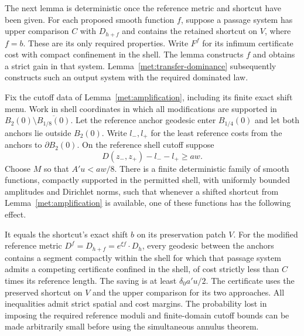 The next lemma is deterministic once the reference metric and shortcut
have been given.  For each proposed smooth function $f$, suppose a
passage system has upper comparison $C$ with $D_{h+f}$ and contains
the retained shortcut on $V$, where $f=b$.  These are its only
required properties.  Write $F^f$ for its infimum certificate cost
with compact confinement in the shell.  The lemma constructs $f$
and obtains a strict gain in that system.  Lemma~\ref{met:transfer-dominance} subsequently
constructs such an output system with the required dominated law.

\begin{lemma}
\label{met:gate}
Fix the cutoff data of Lemma~\ref{met:amplification}, including its
finite exact shift menu.  Work in shell coordinates in which all
modifications are supported in
$B_2(0)\setminus\overline{B_{1/8}(0)}$.  Let the reference anchor
geodesic enter $B_{1/4}(0)$ and let both anchors lie outside $B_2(0)$.
Write $l_-,l_+$ for the least reference costs from the anchors to
$\partial B_2(0)$.  On the reference shell cutoff suppose
\begin{equation}
 D(z_-,z_+)-l_--l_+\geq aw.
 \label{met:landing-gap}
\end{equation}
Choose $M$ so that $A'u<aw/8$.  There is a finite deterministic family
of smooth functions, compactly supported in the permitted shell, with
uniformly bounded amplitudes and Dirichlet norms, such that whenever a
shifted shortcut from Lemma~\ref{met:amplification} is available, one
of these functions has the following effect.

It equals the shortcut's exact shift $b$ on its preservation patch
$V$.  For the modified reference metric
$D^f=D_{h+f}=e^{\xi f}\cdot D_h$, every geodesic between the anchors
contains a segment compactly within the shell for which that passage
system admits a competing certificate confined in the shell, of cost
strictly less than $C$ times its reference length.  The saving is at
least $\delta_0a'u/2$.  The certificate uses the preserved shortcut on
$V$ and the upper comparison for its two approaches.  All inequalities admit strict spatial and cost margins.
The probability lost in imposing the required reference moduli and
finite-domain cutoff bounds can be made arbitrarily small before
using the simultaneous annulus theorem.
\end{lemma}

